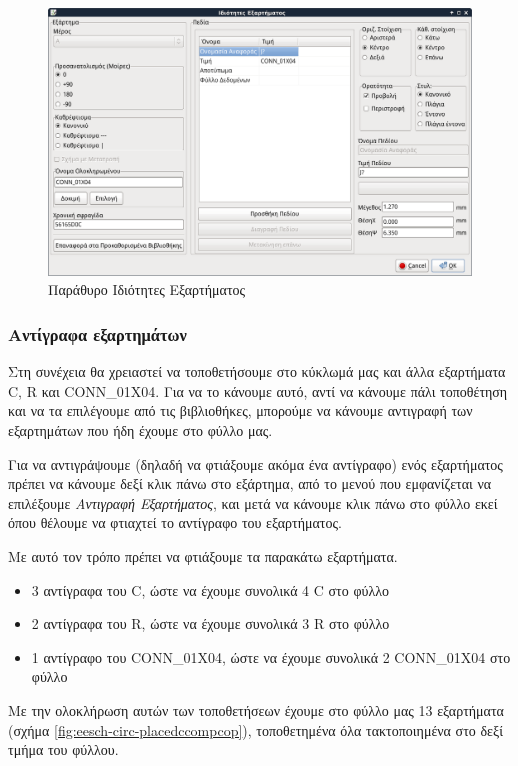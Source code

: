 \documentclass[a4paper]{article}
\begin{document}
\begin{figure}
  \begin{center}
    \includegraphics[width=.5\textwidth]{img/eesch-dial-compprop.png}
    \caption{Παράθυρο Ιδιότητες Εξαρτήματος}
    \label{fig:eesch-dial-compprop}
  \end{center}
\end{figure}

\subsubsection{Αντίγραφα εξαρτημάτων}

Στη συνέχεια θα χρειαστεί να τοποθετήσουμε στο κύκλωμά μας και άλλα εξαρτήματα C, R και CONN\_01X04. Για να το κάνουμε αυτό, αντί να κάνουμε πάλι τοποθέτηση και να τα επιλέγουμε από τις βιβλιοθήκες, μπορούμε να κάνουμε αντιγραφή των εξαρτημάτων που ήδη έχουμε στο φύλλο μας. 

Για να αντιγράψουμε (δηλαδή να φτιάξουμε ακόμα ένα αντίγραφο) ενός εξαρτήματος πρέπει να κάνουμε δεξί κλικ πάνω στο εξάρτημα, από το μενού που εμφανίζεται να επιλέξουμε \textit{Αντιγραφή Εξαρτήματος}, και μετά να κάνουμε κλικ πάνω στο φύλλο εκεί όπου θέλουμε να φτιαχτεί το αντίγραφο του εξαρτήματος. 

Με αυτό τον τρόπο πρέπει να φτιάξουμε τα παρακάτω εξαρτήματα.

\begin{itemize}
    \item 3 αντίγραφα του C, ώστε να έχουμε συνολικά 4 C στο φύλλο
    \item 2 αντίγραφα του R, ώστε να έχουμε συνολικά 3 R στο φύλλο
    \item 1 αντίγραφο του CONN\_01X04, ώστε να έχουμε συνολικά 2 CONN\_01X04 στο φύλλο
\end{itemize}

Με την ολοκλήρωση αυτών των τοποθετήσεων έχουμε στο φύλλο μας 13 εξαρτήματα (σχήμα \ref{fig:eesch-circ-placedccompcop}), τοποθετημένα όλα τακτοποιημένα στο δεξί τμήμα του φύλλου.
\end{document}
